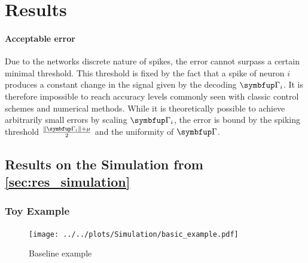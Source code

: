 \chapter{Results}
\subsubsection{Acceptable error}
Due to the networks discrete nature of spikes, the error cannot surpass a certain minimal threshold. This threshold is fixed by the fact that a spike of neuron $i$ produces a constant change in the signal given by the decoding $\bmu{\Gamma}_i$. It is therefore impossible to reach accuracy levels commonly seen with classic control schemes and numerical methods. While it is theoretically possible to achieve arbitrarily small errors by scaling $\bmu{\Gamma}_i$, the error is bound by the spiking threshold  $\frac{\|\bmu{\Gamma}_i\| + \mu}{2}$ and the uniformity of $\bmu{\Gamma}$.\\


\section{Results on the Simulation from \cref{sec:res_simulation}}
\subsection{Toy Example}
\begin{figure}[h!]
	\centering
	\centering
	\texttt{[image: ../../plots/Simulation/basic\_example.pdf]}
	\caption{Baseline example}
	\label{fig:sim_res_1}
\end{figure}

